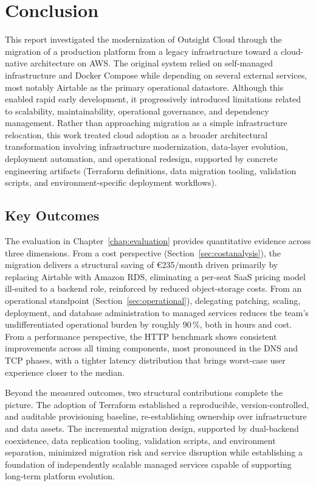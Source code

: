 \chapter{Conclusion}
\label{chap:conclusions}

This report investigated the modernization of Outsight Cloud through the migration of a production platform from a legacy infrastructure toward a cloud-native architecture on AWS. The original system relied on self-managed infrastructure and Docker Compose while depending on several external services, most notably Airtable as the primary operational datastore. Although this enabled rapid early development, it progressively introduced limitations related to scalability, maintainability, operational governance, and dependency management. Rather than approaching migration as a simple infrastructure relocation, this work treated cloud adoption as a broader architectural transformation involving infrastructure modernization, data-layer evolution, deployment automation, and operational redesign, supported by concrete engineering artifacts (Terraform definitions, data migration tooling, validation scripts, and environment-specific deployment workflows).

\section{Key Outcomes}
The evaluation in Chapter~\ref{chap:evaluation} provides quantitative evidence across three dimensions. From a cost perspective (Section~\ref{sec:costanalysis}), the migration delivers a structural saving of €235/month driven primarily by replacing Airtable with Amazon RDS, eliminating a per-seat SaaS pricing model ill-suited to a backend role, reinforced by reduced object-storage costs. From an operational standpoint (Section~\ref{sec:operational}), delegating patching, scaling, deployment, and database administration to managed services reduces the team's undifferentiated operational burden by roughly 90\,\%, both in hours and cost. From a performance perspective, the HTTP benchmark shows consistent improvements across all timing components, most pronounced in the DNS and TCP phases, with a tighter latency distribution that brings worst-case user experience closer to the median.

Beyond the measured outcomes, two structural contributions complete the picture. The adoption of Terraform established a reproducible, version-controlled, and auditable provisioning baseline, re-establishing ownership over infrastructure and data assets. The incremental migration design, supported by dual-backend coexistence, data replication tooling, validation scripts, and environment separation, minimized migration risk and service disruption while establishing a foundation of independently scalable managed services capable of supporting long-term platform evolution.

